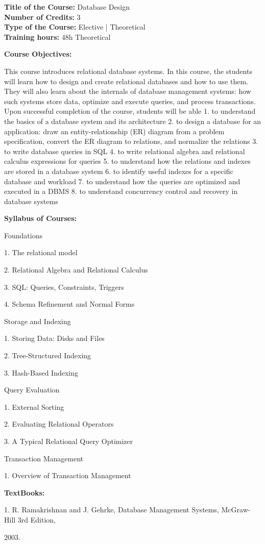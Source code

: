 \documentclass[12pt,a4paper]{article}
\begin{document}
\newpage
\textbf{Title of the Course:} Database Design\\
\textbf{Number of Credits:} 3\\
\textbf{Type of the Course:} Elective | Theoretical\\
\textbf{Training hours:} 48h Theoretical\par\vspace{4pt}
\textbf{Course Objectives:}\par\vspace{2pt}
This course introduces relational database systems. In this course, the students will learn how to
design and create relational databases and how to use them. They will also learn about the internals
of database management systems: how such systems store data, optimize and execute queries, and
process transactions.
Upon successful completion of the course, students will be able
1. to understand the basics of a database system and its architecture
2. to design a database for an application: draw an entity-relationship (ER) diagram from a problem
specification, convert the ER diagram to relations, and normalize the relations
3. to write database queries in SQL
4. to write relational algebra and relational calculus expressions for queries
5. to understand how the relations and indexes are stored in a database system
6. to identify useful indexes for a specific database and workload
7. to understand how the queries are optimized and executed in a DBMS
8. to understand concurrency control and recovery in database systems\par\vspace{4pt}
\textbf{Syllabus of Courses:}\par\vspace{2pt}
Foundations\par
1. The relational model\par
2. Relational Algebra and Relational Calculus\par
3. SQL: Queries, Constraints, Triggers\par
4. Schema Refinement and Normal Forms\par
Storage and Indexing\par
1. Storing Data: Disks and Files\par
2. Tree-Structured Indexing\par
3. Hash-Based Indexing\par
Query Evaluation\par
1. External Sorting\par
2. Evaluating Relational Operators\par
3. A Typical Relational Query Optimizer\par
Transaction Management\par
1. Overview of Transaction Management\par\vspace{4pt}
\textbf{TextBooks:}\par\vspace{2pt}
1. R. Ramakrishnan and J. Gehrke, Database Management Systems, McGraw-Hill 3rd Edition,\par
2003.\par
\vspace{4pt}
\end{document}
